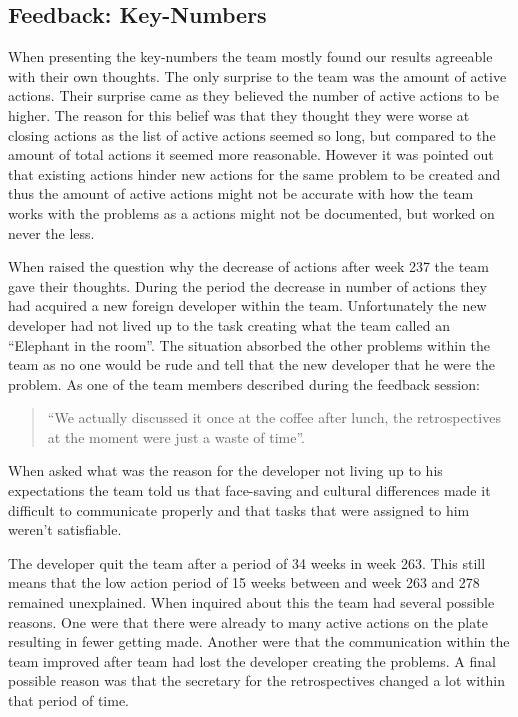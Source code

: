 \subsection{Feedback: Key-Numbers}
When presenting the key-numbers the team mostly found our results agreeable with their own thoughts. The only surprise to the team was the amount of active actions. Their surprise came as they believed the number of active actions to be higher. The reason for this belief was that they thought they were worse at closing actions as the list of active actions seemed so long, but compared to the amount of total actions it seemed more reasonable. However it was pointed out that existing actions hinder new actions for the same problem to be created and thus the amount of active actions might not be accurate with how the team works with the problems as a actions might not be documented, but worked on never the less. 

\label{results-elephant-in-the-room} When raised the question why the decrease of actions after week 237 the team gave their thoughts. During the period the decrease in number of actions they had acquired a new foreign developer within the team. Unfortunately the new developer had not lived up to the task creating what the team called an ``Elephant in the room''. The situation absorbed the other problems within the team as no one would be rude and tell that the new developer that he were the problem. As one of the team members described during the feedback session: 
\begin{quote}
``We actually discussed it once at the coffee after lunch, the retrospectives at the moment were just a waste of time''. 
\end{quote}
When asked what was the reason for the developer not living up to his expectations the team told us that face-saving and cultural differences made it difficult to communicate properly and that tasks that were assigned to him weren't satisfiable. 

The developer quit the team after a period of 34 weeks in week 263. This still means that the low action period of 15 weeks between and week 263 and 278 remained unexplained. When inquired about this the team had several possible reasons. One were that there were already to many active actions on the plate resulting in fewer getting made. Another were that the communication within the team improved after team had lost the developer creating the problems. A final possible reason was that the secretary for the retrospectives changed a lot within that period of time. 

